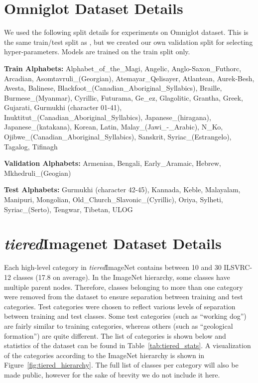 \section{Omniglot Dataset Details}
We used the following split details for experiments on Omniglot dataset. This is the same train/test split as \citep{vinyals2016matchingnet}, but we created our own validation split for selecting hyper-parameters. Models are trained on the train split only.

\textbf{Train Alphabets:}
Alphabet\_of\_the\_Magi,
Angelic,
Anglo-Saxon\_Futhorc,
Arcadian,
Asomtavruli\_(Georgian),
Atemayar\_Qelisayer,
Atlantean,
Aurek-Besh,
Avesta,
Balinese,
Blackfoot\_(Canadian\_Aboriginal\_Syllabics),
Braille,
Burmese\_(Myanmar),
Cyrillic,
Futurama,
Ge\_ez,
Glagolitic,
Grantha,
Greek,
Gujarati,
Gurmukhi (character 01-41),
Inuktitut\_(Canadian\_Aboriginal\_Syllabics),
Japanese\_(hiragana),
Japanese\_(katakana),
Korean,
Latin,
Malay\_(Jawi\_-\_Arabic),
N\_Ko,
Ojibwe\_(Canadian\_Aboriginal\_Syllabics),
Sanskrit,
Syriac\_(Estrangelo),
Tagalog,
Tifinagh

\textbf{Validation Alphabets:}
Armenian, 
Bengali, 
Early\_Aramaic, 
Hebrew, 
Mkhedruli\_(Geogian) 

\textbf{Test Alphabets:}
Gurmukhi (character 42-45),
Kannada,
Keble,
Malayalam,
Manipuri,
Mongolian,
Old\_Church\_Slavonic\_(Cyrillic),
Oriya,
Sylheti,
Syriac\_(Serto),
Tengwar,
Tibetan,
ULOG

\section{\textit{tiered}Imagenet Dataset Details}

Each high-level category in \textit{tiered}ImageNet contains between 10 and 30 ILSVRC-12 classes (17.8 on average). In the ImageNet hierarchy, some classes have multiple parent nodes. Therefore, classes belonging to more than one category were removed from the dataset to ensure separation between training and test categories. Test
categories were chosen to reflect various levels of separation between training
and test classes. Some test categories (such as ``working dog'') are fairly similar to training categories, whereas others (such as ``geological formation'')
are quite different. The list of categories is shown below and statistics of the dataset can be found in Table~\ref{tab:tiered_stats}. A visualization of the categories according to the ImageNet hierarchy is shown in Figure~\ref{fig:tiered_hierarchy}. The full list of classes per category will
also be made public, however for the sake of brevity we do not include it here.

